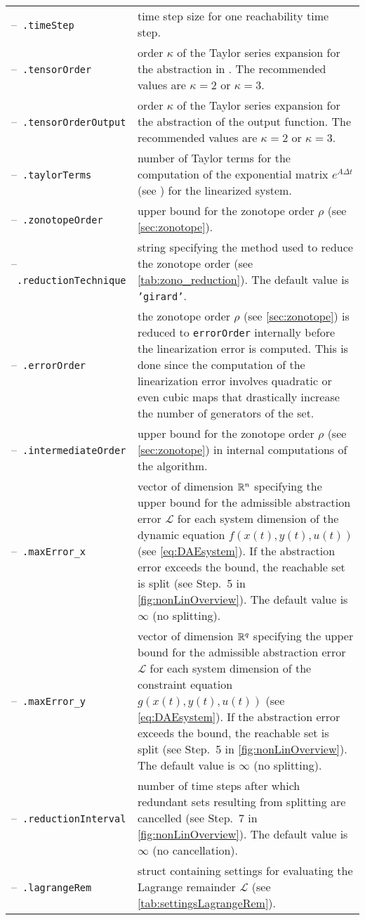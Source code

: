 \begin{center}
\renewcommand{\arraystretch}{1.3}
\begin{longtable}[t]{l p{10cm}}	
	--~\texttt{.timeStep} & time step size for one reachability time step. \\
	--~\texttt{.tensorOrder} & order $\kappa$ of the Taylor series expansion for the abstraction in \cite[eq.~(8)]{Althoff2014a}. The recommended values are $\kappa = 2$ or $\kappa = 3$. \\
	--~\texttt{.tensorOrderOutput} & order $\kappa$ of the Taylor series expansion for the abstraction of the output function. The recommended values are $\kappa = 2$ or $\kappa = 3$. \\
	--~\texttt{.taylorTerms} & number of Taylor terms for the computation of the exponential matrix $e^{A\Delta t}$ (see \cite[Eq. (3.2)]{Althoff2010a}) for the linearized system. \\
	--~\texttt{.zonotopeOrder} & upper bound for the zonotope order $\rho$ (see \cref{sec:zonotope}). \\
	--~\texttt{.reductionTechnique} & string specifying the method used to reduce the zonotope order (see \cref{tab:zono_reduction}). The default value is \texttt{'girard'}. \\
	--~\texttt{.errorOrder} & the zonotope order $\rho$ (see \cref{sec:zonotope}) is reduced to \texttt{errorOrder} internally before the linearization error is computed. This is done since the computation of the linearization error involves quadratic or even cubic maps that drastically increase the number of generators of the set. \\
	--~\texttt{.intermediateOrder} & upper bound for the zonotope order $\rho$ (see \cref{sec:zonotope}) in internal computations of the algorithm. \\
	--~\texttt{.maxError\_x} & vector of dimension $\mathbb{R}^n$ specifying the upper bound for the admissible abstraction error $\mathcal{L}$ for each system dimension of the dynamic equation $f(x(t),y(t),u(t))$ (see \eqref{eq:DAEsystem}). If the abstraction error exceeds the bound, the reachable set is split (see Step.~5 in \cref{fig:nonLinOverview}). The default value is $\infty$ (no splitting).\\
	--~\texttt{.maxError\_y} & vector of dimension $\mathbb{R}^q$ specifying the upper bound for the admissible abstraction error $\mathcal{L}$ for each system dimension of the constraint equation $g(x(t),y(t),u(t))$ (see \eqref{eq:DAEsystem}). If the abstraction error exceeds the bound, the reachable set is split (see Step.~5 in \cref{fig:nonLinOverview}). The default value is $\infty$ (no splitting).\\
	--~\texttt{.reductionInterval} & number of time steps after which redundant sets resulting from splitting are cancelled (see Step.~7 in \cref{fig:nonLinOverview}). The default value is $\infty$ (no cancellation). \\
	--~\texttt{.lagrangeRem} & struct containing settings for evaluating the Lagrange remainder $\mathcal{L}$ (see \cref{tab:settingsLagrangeRem}). \\
\end{longtable}
\end{center}

